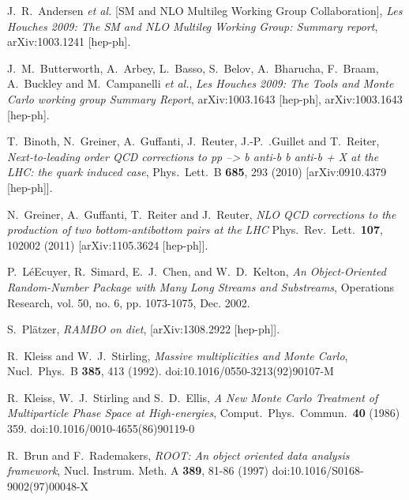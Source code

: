 \documentclass[12pt]{book}
\begin{document}
\begin{thebibliography}{19}
  J.~R.~Andersen {\it et al.}  [SM and NLO Multileg Working Group
  Collaboration],
  {\em Les Houches 2009: The SM and NLO Multileg Working Group:
    Summary report},
  arXiv:1003.1241 [hep-ph].

  J.~M.~Butterworth, A.~Arbey, L.~Basso, S.~Belov, A.~Bharucha,
  F.~Braam, A.~Buckley and M.~Campanelli {\it et al.},
  {\em Les Houches 2009: The Tools and Monte Carlo working group
    Summary Report},
  arXiv:1003.1643 [hep-ph], arXiv:1003.1643 [hep-ph].

  T.~Binoth, N.~Greiner, A.~Guffanti, J.~Reuter, J.-P.~.Guillet and T.~Reiter,
  {\em Next-to-leading order QCD corrections to pp --> b anti-b b
    anti-b + X at the LHC: the quark induced case},
  Phys.\ Lett.\ B {\bf 685}, 293 (2010)
  [arXiv:0910.4379 [hep-ph]].

  N.~Greiner, A.~Guffanti, T.~Reiter and J.~Reuter,
  {\em NLO QCD corrections to the production of two bottom-antibottom
    pairs at the LHC}
  Phys.\ Rev.\ Lett.\  {\bf 107}, 102002 (2011)
  [arXiv:1105.3624 [hep-ph]].

  P.~L\'{e}Ecuyer, R.~Simard, E.~J.~Chen, and W.~D.~Kelton,
  {\em An Object-Oriented Random-Number Package with Many Long Streams and
    Substreams},
  Operations Research, vol. 50, no. 6, pp. 1073-1075, Dec. 2002.

  S.~Pl\"atzer,
  {\em RAMBO on diet},
  [arXiv:1308.2922 [hep-ph]].

  R.~Kleiss and W.~J.~Stirling,
  {\em Massive multiplicities and Monte Carlo},
  Nucl.\ Phys.\ B {\bf 385}, 413 (1992).
  doi:10.1016/0550-3213(92)90107-M

  R.~Kleiss, W.~J.~Stirling and S.~D.~Ellis,
  {\em A New Monte Carlo Treatment of Multiparticle Phase Space at High-energies},
  Comput.\ Phys.\ Commun.\  {\bf 40} (1986) 359.
  doi:10.1016/0010-4655(86)90119-0

  R.~Brun and F.~Rademakers,
  {\em ROOT: An object oriented data analysis framework},
  Nucl. Instrum. Meth. A \textbf{389}, 81-86 (1997)
  doi:10.1016/S0168-9002(97)00048-X


\end{thebibliography}
\end{document}
